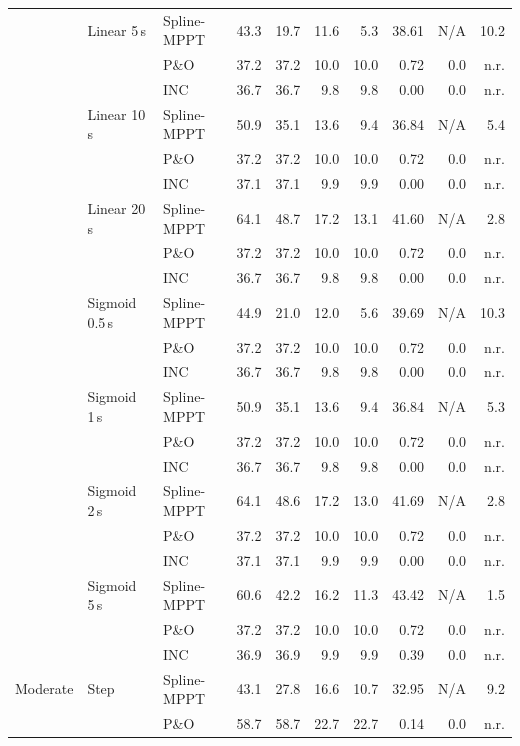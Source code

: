 \begin{longtable}{@{}lll rr rr r rr@{}}
\addlinespace[2pt]
 & Linear 5\,s & Spline-MPPT & 43.3 & 19.7 & 11.6 & 5.3 & 38.61 & N/A & 10.2 \\
 &  & P\&O & 37.2 & 37.2 & 10.0 & 10.0 & 0.72 & 0.0 & n.r. \\
 &  & INC & 36.7 & 36.7 & 9.8 & 9.8 & 0.00 & 0.0 & n.r. \\
\addlinespace[2pt]
 & Linear 10\,s & Spline-MPPT & 50.9 & 35.1 & 13.6 & 9.4 & 36.84 & N/A & 5.4 \\
 &  & P\&O & 37.2 & 37.2 & 10.0 & 10.0 & 0.72 & 0.0 & n.r. \\
 &  & INC & 37.1 & 37.1 & 9.9 & 9.9 & 0.00 & 0.0 & n.r. \\
\addlinespace[2pt]
 & Linear 20\,s & Spline-MPPT & 64.1 & 48.7 & 17.2 & 13.1 & 41.60 & N/A & 2.8 \\
 &  & P\&O & 37.2 & 37.2 & 10.0 & 10.0 & 0.72 & 0.0 & n.r. \\
 &  & INC & 36.7 & 36.7 & 9.8 & 9.8 & 0.00 & 0.0 & n.r. \\
\addlinespace[2pt]
 & Sigmoid 0.5\,s & Spline-MPPT & 44.9 & 21.0 & 12.0 & 5.6 & 39.69 & N/A & 10.3 \\
 &  & P\&O & 37.2 & 37.2 & 10.0 & 10.0 & 0.72 & 0.0 & n.r. \\
 &  & INC & 36.7 & 36.7 & 9.8 & 9.8 & 0.00 & 0.0 & n.r. \\
\addlinespace[2pt]
 & Sigmoid 1\,s & Spline-MPPT & 50.9 & 35.1 & 13.6 & 9.4 & 36.84 & N/A & 5.3 \\
 &  & P\&O & 37.2 & 37.2 & 10.0 & 10.0 & 0.72 & 0.0 & n.r. \\
 &  & INC & 36.7 & 36.7 & 9.8 & 9.8 & 0.00 & 0.0 & n.r. \\
\addlinespace[2pt]
 & Sigmoid 2\,s & Spline-MPPT & 64.1 & 48.6 & 17.2 & 13.0 & 41.69 & N/A & 2.8 \\
 &  & P\&O & 37.2 & 37.2 & 10.0 & 10.0 & 0.72 & 0.0 & n.r. \\
 &  & INC & 37.1 & 37.1 & 9.9 & 9.9 & 0.00 & 0.0 & n.r. \\
\addlinespace[2pt]
 & Sigmoid 5\,s & Spline-MPPT & 60.6 & 42.2 & 16.2 & 11.3 & 43.42 & N/A & 1.5 \\
 &  & P\&O & 37.2 & 37.2 & 10.0 & 10.0 & 0.72 & 0.0 & n.r. \\
 &  & INC & 36.9 & 36.9 & 9.9 & 9.9 & 0.39 & 0.0 & n.r. \\
\addlinespace[2pt]
Moderate & Step & Spline-MPPT & 43.1 & 27.8 & 16.6 & 10.7 & 32.95 & N/A & 9.2 \\
 &  & P\&O & 58.7 & 58.7 & 22.7 & 22.7 & 0.14 & 0.0 & n.r. \\

\end{longtable}
